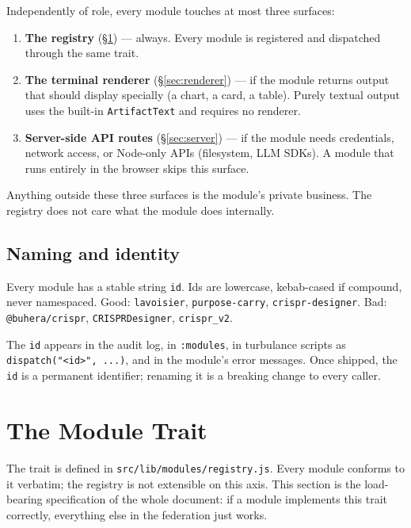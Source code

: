 \documentclass[11pt,a4paper]{article}
\theoremstyle{contract}
\begin{document}
Independently of role, every module touches at most three surfaces:

\begin{enumerate}[leftmargin=1.6em,itemsep=2pt]
\item \textbf{The registry} (\S\ref{sec:registry}) --- always. Every
module is registered and dispatched through the same trait.
\item \textbf{The terminal renderer} (\S\ref{sec:renderer}) --- if the
module returns output that should display specially (a chart, a card, a
table). Purely textual output uses the built-in \texttt{ArtifactText}
and requires no renderer.
\item \textbf{Server-side API routes} (\S\ref{sec:server}) --- if the
module needs credentials, network access, or Node-only APIs
(filesystem, LLM SDKs). A module that runs entirely in the browser
skips this surface.
\end{enumerate}

Anything outside these three surfaces is the module's private business.
The registry does not care what the module does internally.

\subsection{Naming and identity}

Every module has a stable string \texttt{id}. Ids are lowercase,
kebab-cased if compound, never namespaced. Good: \texttt{lavoisier},
\texttt{purpose-carry}, \texttt{crispr-designer}. Bad:
\texttt{@buhera/crispr}, \texttt{CRISPRDesigner}, \texttt{crispr\_v2}.

The \texttt{id} appears in the audit log, in \texttt{:modules}, in
turbulance scripts as \texttt{dispatch("<id>", ...)}, and in the
module's error messages. Once shipped, the \texttt{id} is a permanent
identifier; renaming it is a breaking change to every caller.

\section{The Module Trait}
\label{sec:registry}

The trait is defined in \texttt{src/lib/modules/registry.js}. Every
module conforms to it verbatim; the registry is not extensible on this
axis. This section is the load-bearing specification of the whole
document: if a module implements this trait correctly, everything else
in the federation just works.
\end{document}

